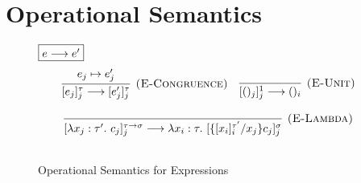 \section{Operational Semantics}
\label{sec-op}
\begin{figure}[t]
\footnotesize{


$\fbox{$e \longrightarrow e'$}$
\[
\begin{array}{c}
\infer[\textsc{(E-Congruence)}]
  {[e_j]^\tau_j \longrightarrow [e_j']^\tau_j}
  {e_j \mapsto e_j'} \quad 

\infer[\textsc{(E-Unit)}]
  {[()_j]^{1}_j \longrightarrow ()_i}
  {} \\[3ex]
  
\infer[\textsc{(E-Lambda)}]
  {[\lambda x_j : \tau'.\ c_j]^{\tau \rightarrow \sigma}_{j} \longrightarrow \lambda x_i : \tau.\ [\{[x_i]^{\tau'}_{i}/x_j\}c_j]^\sigma_{j}}
  {} \\[3ex]
\end{array}
\]
}
\caption{Operational Semantics for Expressions}
\label{fig-op1}

\end{figure}

